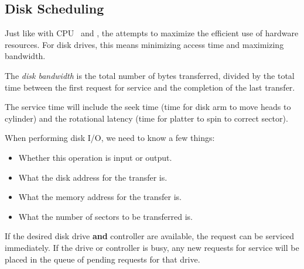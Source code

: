 \subsection{Disk Scheduling}\label{subsec:Disk_Scheduling}
Just like with CPU~ and , the  attempts to maximize the efficient use of hardware resources.
For disk drives, this means minimizing access time and maximizing bandwidth.

\begin{definition}\label{def:Disk_Bandwidth}
  The \emph{disk bandwidth} is the total number of bytes transferred, divided by the total time between the first request for service and the completion of the last transfer.

  The service time will include the seek time (time for disk arm to move heads to cylinder) and the rotational latency (time for platter to spin to correct sector).
\end{definition}

When performing disk I/O, we need to know a few things:
\begin{itemize}[noitemsep]
\item Whether this operation is input or output.
\item What the disk address for the transfer is.
\item What the memory address for the transfer is.
\item What the number of sectors to be transferred is.
\end{itemize}

If the desired disk drive \textbf{and} controller are available, the request can be serviced immediately.
If the drive or controller is busy, any new requests for service will be placed in the queue of pending requests for that drive.


